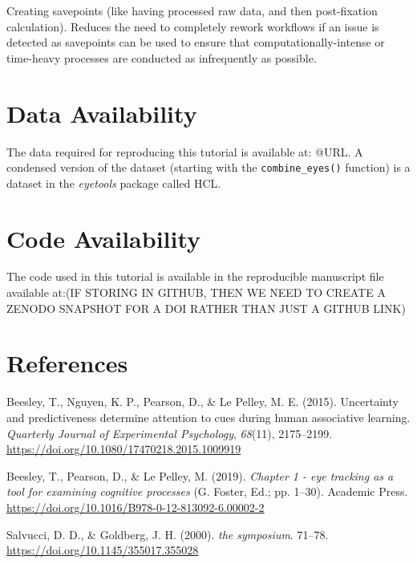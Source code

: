 \documentclass[
  man,
  floatsintext,
  longtable,
  nolmodern,
  notxfonts,
  notimes,
  colorlinks=true,linkcolor=blue,citecolor=blue,urlcolor=blue]{apa7}
\newlength{\cslhangindent}
\newenvironment{CSLReferences}[2] %
 {\begin{list}{}{%
  \setlength{\itemindent}{0pt}
  \setlength{\leftmargin}{0pt}
  \setlength{\parsep}{0pt}
  \ifodd #1
   \setlength{\leftmargin}{\cslhangindent}
   \setlength{\itemindent}{-1\cslhangindent}
  \fi
  \setlength{\itemsep}{#2\baselineskip}}}
 {\end{list}}
\begin{document}
Creating savepoints (like having processed raw data, and then
post-fixation calculation). Reduces the need to completely rework
workflows if an issue is detected as savepoints can be used to ensure
that computationally-intense or time-heavy processes are conducted as
infrequently as possible.

\section{Data Availability}\label{data-availability}

The data required for reproducing this tutorial is available at: @URL. A
condensed version of the dataset (starting with the
\texttt{combine\_eyes()} function) is a dataset in the \emph{eyetools}
package called HCL.

\section{Code Availability}\label{code-availability}

The code used in this tutorial is available in the reproducible
manuscript file available at:(IF STORING IN GITHUB, THEN WE NEED TO
CREATE A ZENODO SNAPSHOT FOR A DOI RATHER THAN JUST A GITHUB LINK)

\section{References}\label{references}

\label{refs}
\begin{CSLReferences}{1}{0}
Beesley, T., Nguyen, K. P., Pearson, D., \& Le Pelley, M. E. (2015).
Uncertainty and predictiveness determine attention to cues during human
associative learning. \emph{Quarterly Journal of Experimental
Psychology}, \emph{68}(11), 2175--2199.
\url{https://doi.org/10.1080/17470218.2015.1009919}

Beesley, T., Pearson, D., \& Le Pelley, M. (2019). \emph{Chapter 1 - eye
tracking as a tool for examining cognitive processes} (G. Foster, Ed.;
pp. 1--30). Academic Press.
\url{https://doi.org/10.1016/B978-0-12-813092-6.00002-2}

Salvucci, D. D., \& Goldberg, J. H. (2000). \emph{the symposium}.
71--78. \url{https://doi.org/10.1145/355017.355028}

\end{CSLReferences}
\end{document}
